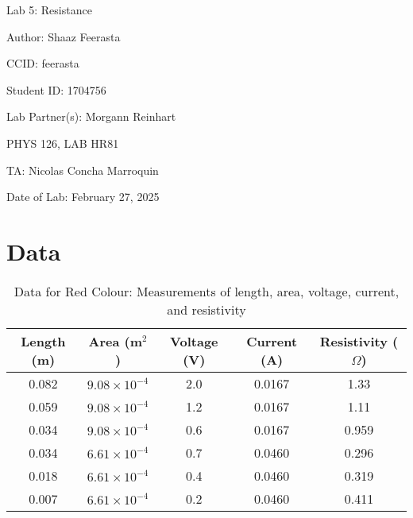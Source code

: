 \documentclass[12pt]{article}
\begin{document}
\pagebreak

\begin{titlepage}
    \begin{center}
        \vspace*{\fill}
        Lab 5: Resistance

        Author: Shaaz Feerasta

        CCID: feerasta

        Student ID: 1704756

        Lab Partner(s): Morgann Reinhart

        PHYS 126, LAB HR81

        TA: Nicolas Concha Marroquin

        Date of Lab: February 27, 2025
        \vspace*{\fill}
    \end{center}
\end{titlepage}

\section{Data}

\begin{table}[H]
\caption{Data for Red Colour: Measurements of length, area, voltage, current, and resistivity}
\centering
\begin{tabular}{|c|c|c|c|c|}
\hline
Length (m) & Area (m$^2$) & Voltage (V) & Current (A) & Resistivity ($\Omega$) \\ \hline
0.082   & $9.08 \times 10^{-4}$   & 2.0   & 0.0167  & 1.33 \\ \hline
0.059   & $9.08 \times 10^{-4}$   & 1.2   & 0.0167   & 1.11\\ \hline
0.034   & $9.08 \times 10^{-4}$   & 0.6   & 0.0167   & 0.959 \\ \hline
0.034   & $6.61 \times 10^{-4}$   & 0.7   & 0.0460   & 0.296 \\ \hline
0.018   & $6.61 \times 10^{-4}$   & 0.4   & 0.0460   & 0.319 \\ \hline
0.007   & $6.61 \times 10^{-4}$   & 0.2   & 0.0460   & 0.411 \\ \hline
\end{tabular}
\label{tab:red_data}
\end{table}
\end{document}
